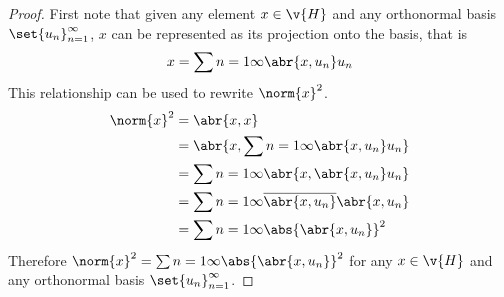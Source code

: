 \documentclass[11pt, oneside]{article}
\begin{document}
\begin{enumerate}
\begin{enumerate}
        \begin{proof}
          First note that given any element $x \in \v{H}$ and any orthonormal
          basis $\set{u_n}_{n = 1}^{\infty}$, $x$ can be represented as its
          projection onto the basis, that is
          \[
            x = \sum{n = 1}{\infty}{\abr{x, u_n} u_n}
          \]
          This relationship can be used to rewrite $\norm{x}^2$.
          \begin{align*}
            \norm{x}^2 &= \abr{x, x} \\
            &= \abr{x, \sum{n = 1}{\infty}{\abr{x, u_n} u_n}} \\
            &= \sum{n = 1}{\infty}{\abr{x, \abr{x, u_n} u_n}} \\
            &= \sum{n = 1}{\infty}{\overline{\abr{x, u_n}} \abr{x, u_n}} \\
            &= \sum{n = 1}{\infty}{\abs{\abr{x, u_n}}^2} \\
          \end{align*}
          Therefore $\norm{x}^2 = \sum{n = 1}{\infty}{\abs{\abr{x, u_n}}^2}$
          for any $x \in \v{H}$ and any orthonormal basis
          $\set{u_n}_{n = 1}^{\infty}$.


\end{proof}
\end{enumerate}
\end{enumerate}
\end{document}
